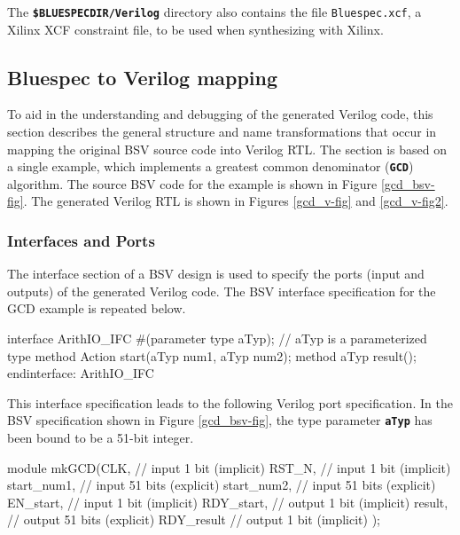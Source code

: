 \documentclass{article}
\newcommand{\te}[1]{\texttt{#1}}
\newenvironment{centerboxverbatim}
  {\center
   \boxedverbatim}
  {\endboxedverbatim
  {\endcenter }}
\begin{document}
The {\bf\tt \$BLUESPECDIR/Verilog}  directory also contains the file
\te{Bluespec.xcf},   a Xilinx XCF
constraint file,  to be used when synthesizing with Xilinx. 



\subsection{Bluespec to Verilog mapping}
\label{sec-vl-name-mapping}

To aid in the understanding and debugging of the generated Verilog
code, this section describes the general structure and name
transformations that occur in mapping the original BSV source code
into Verilog RTL.  The section is based on a single example, which
implements a greatest common denominator ({\bf\tt GCD}) algorithm.  The
source BSV code for the example is shown in Figure \ref{gcd_bsv-fig}.
The generated Verilog RTL is shown in Figures \ref{gcd_v-fig} and
\ref{gcd_v-fig2}.


\subsubsection{Interfaces and Ports}
The interface section of a BSV design is used to specify the ports
(input and outputs) of the generated Verilog code.  The BSV interface
specification for the GCD example is repeated below.


\begin{centerboxverbatim}
interface ArithIO_IFC #(parameter type aTyp); // aTyp is a parameterized type
    method Action start(aTyp num1, aTyp num2);
    method aTyp result();
endinterface: ArithIO_IFC
\end{centerboxverbatim}


This interface specification leads to the following Verilog port
specification.  In the BSV specification shown in Figure
\ref{gcd_bsv-fig}, the type parameter {\bf\tt aTyp} has been bound to be a
51-bit integer.

\begin{centerboxverbatim}
module mkGCD(CLK,                 // input   1 bit  (implicit)
             RST_N,               // input   1 bit  (implicit)
             start_num1,          // input  51 bits (explicit)
             start_num2,          // input  51 bits (explicit)
             EN_start,            // input   1 bit  (implicit)
             RDY_start,           // output  1 bit  (implicit)
             result,              // output 51 bits (explicit)
             RDY_result           // output  1 bit  (implicit)
             );
\end{centerboxverbatim}
\end{document}

